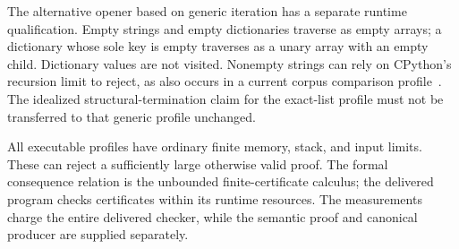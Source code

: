 \documentclass[11pt,letterpaper]{article}
\theoremstyle{definition}\newtheorem{definition}[theorem]{Definition}
\theoremstyle{remark}\newtheorem{remark}[theorem]{Remark}
\begin{document}
The alternative opener based on generic iteration has a separate
runtime qualification.  Empty strings and empty dictionaries traverse
as empty arrays; a dictionary whose sole key is empty traverses as a
unary array with an empty child.  Dictionary values are not visited.
Nonempty strings can rely on CPython's recursion limit to reject, as
also occurs in a current corpus comparison profile~\cite{transient}.
The idealized structural-termination claim for the exact-list profile
must not be transferred to that generic profile unchanged.

All executable profiles have ordinary finite memory, stack, and input
limits.  These can reject a sufficiently large otherwise valid proof.
The formal consequence relation is the unbounded finite-certificate
calculus; the delivered program checks certificates within its runtime
resources.  The measurements charge the entire delivered checker,
while the semantic proof and canonical producer are supplied separately.

\end{document}

